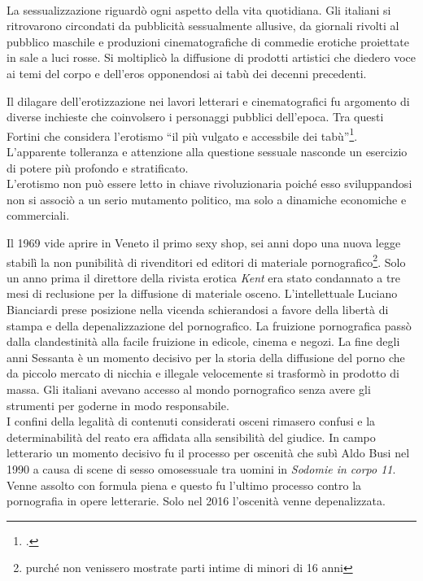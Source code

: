 \paragraph{}La sessualizzazione riguardò ogni aspetto della vita quotidiana.
Gli italiani si ritrovarono circondati da pubblicità sessualmente allusive, da giornali rivolti al pubblico maschile e produzioni cinematografiche di commedie erotiche proiettate in sale a luci rosse.
Si moltiplicò la diffusione di prodotti artistici che diedero voce ai temi del corpo e dell'eros opponendosi ai tabù dei decenni precedenti.

Il dilagare dell'erotizzazione nei lavori letterari e cinematografici fu argomento di diverse inchieste che coinvolsero i personaggi pubblici dell'epoca.
Tra questi Fortini che considera l'erotismo \enquote{il più vulgato e accessbile dei tabù}\footcite{fortini}.
L'apparente tolleranza e attenzione alla questione sessuale nasconde un esercizio di potere più profondo e stratificato.
\\L'erotismo non può essere letto in chiave rivoluzionaria poiché esso sviluppandosi non si associò a un serio mutamento politico, ma solo a dinamiche economiche e commerciali.

Il 1969 vide aprire in Veneto il primo sexy shop, sei anni dopo una nuova legge stabilì la non punibilità di rivenditori ed editori di materiale pornografico\footnote{purché non venissero mostrate parti intime di minori di 16 anni}.
Solo un anno prima il direttore della rivista erotica \textit{Kent} era stato condannato a tre mesi di reclusione per la diffusione di materiale osceno.
L'intellettuale Luciano Bianciardi prese posizione nella vicenda schierandosi a favore della libertà di stampa e della depenalizzazione del pornografico.
La fruizione pornografica passò dalla clandestinità alla facile fruizione in edicole, cinema e negozi.
La fine degli anni Sessanta è un momento decisivo per la storia della diffusione del porno che da piccolo mercato di nicchia e illegale velocemente si trasformò in prodotto di massa. 
Gli italiani avevano accesso al mondo pornografico senza avere gli strumenti per goderne in modo responsabile.
\\I confini della legalità di contenuti considerati osceni rimasero confusi e la determinabilità del reato era affidata alla sensibilità del giudice.
In campo letterario un momento decisivo fu il processo per oscenità che subì Aldo Busi nel 1990 a causa di scene di sesso omosessuale tra uomini in \textit{Sodomie in corpo 11}.
Venne assolto con formula piena e questo fu l'ultimo processo contro la pornografia in opere letterarie.
Solo nel 2016 l'oscenità venne depenalizzata.

